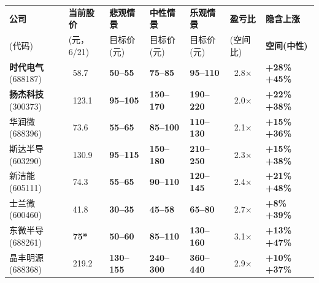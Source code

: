 \begin{exhibitbox}
\centering
\small
\setlength{\tabcolsep}{3pt}
\begin{tabularx}{\textwidth}{X C{1.4cm} C{1.55cm} C{1.6cm} C{1.6cm} C{1.25cm} C{1.6cm}}
\toprule
\centering\textbf{公司} & \textbf{当前股价} & \textbf{悲观情景} & \textbf{中性情景} & \textbf{乐观情景} & \textbf{盈亏比} & \textbf{隐含上涨} \\
\centering (代码) & (元，6/21) & 目标价 (元) & 目标价 (元) & 目标价 (元) & (空间比) & \textbf{空间(中性)} \\
\midrule
{}
\centering \textbf{时代电气} \newline \scriptsize(688187) & ~58.7 & \textbf{50–55} & \textbf{75–85} & \textbf{95–110} & ~2.8× & \textbf{+28\% ~ +45\%} \\
\centering \textbf{扬杰科技} \newline \scriptsize(300373) & ~123.1 & \textbf{95–105} & \textbf{150–170} & \textbf{190–220} & ~2.0× & \textbf{+22\% ~ +38\%} \\
\midrule
{}
\centering 华润微 \newline \scriptsize(688396) & ~73.6 & \textbf{55–65} & \textbf{85–100} & \textbf{110–130} & ~2.1× & \textbf{+15\% ~ +36\%} \\
\centering 斯达半导 \newline \scriptsize(603290) & ~130.9 & \textbf{95–115} & \textbf{150–180} & \textbf{210–250} & ~2.3× & \textbf{+15\% ~ +38\%} \\
\centering 新洁能 \newline \scriptsize(605111) & ~74.3 & \textbf{55–65} & \textbf{90–110} & \textbf{120–145} & ~2.4× & \textbf{+21\% ~ +48\%} \\
\midrule
{}
\centering 士兰微 \newline \scriptsize(600460) & ~41.8 & \textbf{30–35} & \textbf{45–58} & \textbf{65–80} & ~2.7× & \textbf{+8\% ~ +39\%} \\
\centering 东微半导 \newline \scriptsize(688261) & ~\textbf{75*} & \textbf{50–60} & \textbf{85–110} & \textbf{130–160} & ~3.1× & \textbf{+13\% ~ +47\%} \\
\centering 晶丰明源 \newline \scriptsize(688368) & ~219.2 & \textbf{130–155} & \textbf{240–300} & \textbf{360–440} & ~2.9× & \textbf{+10\% ~ +37\%} \\

\end{tabularx}
\end{exhibitbox}
